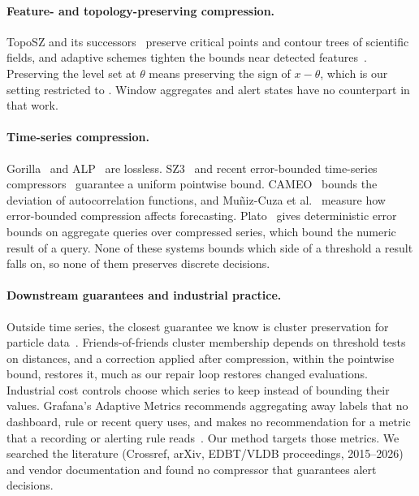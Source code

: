 \paragraph{Feature- and topology-preserving compression.} TopoSZ and its
successors~\cite{yan2024toposz} preserve critical points and contour trees
of scientific fields, and adaptive schemes tighten the bounds near
detected features~\cite{adaptivefeature2024}. Preserving the level set at
$\theta$ means preserving the sign of $x - \theta$, which is our setting
restricted to . Window aggregates and alert states have no
counterpart in that work.

\paragraph{Time-series compression.} Gorilla~\cite{pelkonen2015gorilla} and
ALP~\cite{afroozeh2024alp} are lossless. SZ3~\cite{liang2023sz3} and recent
error-bounded time-series compressors~\cite{shrink2025} guarantee a uniform
pointwise bound. CAMEO~\cite{cameo2025} bounds the deviation of
autocorrelation functions, and Muñiz-Cuza et
al.~\cite{munizcuza2024forecasting} measure how error-bounded compression
affects forecasting. Plato~\cite{lin2020plato} gives deterministic error
bounds on aggregate queries over compressed series, which bound the
numeric result of a query. None of these systems bounds which side of a
threshold a result falls on, so none of them preserves discrete decisions.

\paragraph{Downstream guarantees and industrial practice.} Outside time
series, the closest guarantee we know is cluster preservation for particle
data~\cite{ren2026clusters}. Friends-of-friends cluster membership depends
on threshold tests on distances, and a correction applied after
compression, within the pointwise bound, restores it, much as our repair
loop restores changed evaluations. Industrial cost controls choose which
series to keep instead of bounding their values. Grafana's Adaptive
Metrics recommends aggregating away labels that no dashboard, rule or
recent query uses, and makes no recommendation for a metric that a
recording or alerting rule reads~\cite{grafana2026adaptive}. Our method
targets those metrics. We searched the literature (Crossref, arXiv,
EDBT/VLDB proceedings, 2015--2026) and vendor documentation and found no
compressor that guarantees alert decisions.
